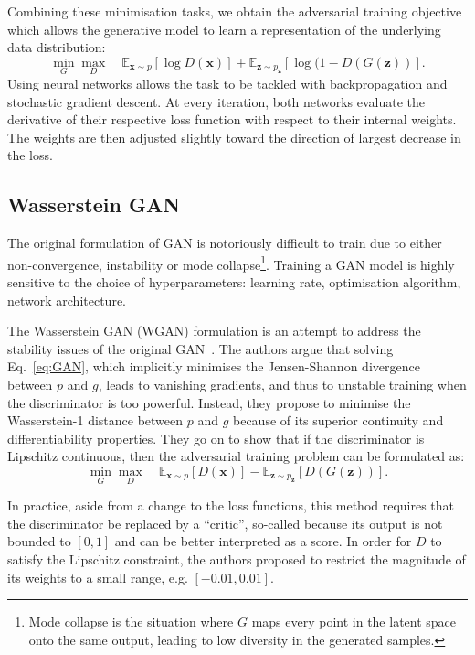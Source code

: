 Combining these minimisation tasks, we obtain the adversarial training objective which allows the generative model to learn a representation of the underlying data distribution:
\begin{equation}\label{eq:GAN}
    \min_G \max_D \quad
    \mathbb{E}_{\mathbf{x} \sim p} [ \log D(\mathbf{x}) ] +
    \mathbb{E}_{\mathbf{z} \sim p_\mathbf{z}} [ \log( 1 - D(G(\mathbf{z}) )].
\end{equation}
Using neural networks allows the task to be tackled with backpropagation and stochastic gradient descent. At every iteration, both networks evaluate the derivative of their respective loss function with respect to their internal weights. The weights are then adjusted slightly toward the direction of largest decrease in the loss.


\subsection{Wasserstein GAN}
The original formulation of GAN is notoriously difficult to train due to either non-convergence, instability or mode collapse\footnote{Mode collapse is the situation where $G$ maps every point in the latent space onto the same output, leading to low diversity in the generated samples.}. 
Training a GAN model is highly sensitive to the choice of hyperparameters: learning rate, optimisation algorithm, network architecture. 

The Wasserstein GAN (WGAN) formulation is an attempt to address the stability issues of the original GAN~\cite{arjovsky2017wasserstein}. The authors argue that solving Eq.~\ref{eq:GAN}, which implicitly minimises the Jensen-Shannon divergence between $p$ and $g$, leads to vanishing gradients, and thus to unstable training when the discriminator is too powerful.
Instead, they propose to minimise the Wasserstein-1 distance between $p$ and $g$ because of its superior continuity and differentiability properties. They go on to show that if the discriminator is Lipschitz continuous, then the adversarial training problem can be formulated as:
\begin{equation}
    \min_G \max_D \quad 
        \mathbb{E}_{\mathbf{x} \sim p} \left[ D(\mathbf{x}) \right] - 
        \mathbb{E}_{\mathbf{z} \sim p_\mathbf{z}} \left[ D(G(\mathbf{z})) \right].
\end{equation}

In practice, aside from a change to the loss functions, this method requires that the discriminator be replaced by a ``critic'', so-called because its output is not bounded to $[0, 1]$ and can be better interpreted as a score. In order for $D$ to satisfy the Lipschitz constraint, the authors proposed to restrict the magnitude of its weights to a small range, e.g. $[-0.01, 0.01]$.

